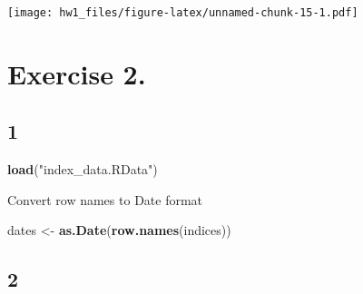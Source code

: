 \documentclass[
]{article}
\newenvironment{Shaded}{\begin{snugshade}}{\end{snugshade}}
\newcommand{\AttributeTok}[1]{\textcolor[rgb]{0.13,0.29,0.53}{#1}}
\newcommand{\CommentTok}[1]{\textcolor[rgb]{0.56,0.35,0.01}{\textit{#1}}}
\newcommand{\FunctionTok}[1]{\textcolor[rgb]{0.13,0.29,0.53}{\textbf{#1}}}
\newcommand{\NormalTok}[1]{#1}
\newcommand{\OtherTok}[1]{\textcolor[rgb]{0.56,0.35,0.01}{#1}}
\newcommand{\SpecialCharTok}[1]{\textcolor[rgb]{0.81,0.36,0.00}{\textbf{#1}}}
\newcommand{\StringTok}[1]{\textcolor[rgb]{0.31,0.60,0.02}{#1}}
\begin{document}
\texttt{[image: hw1\_files/figure-latex/unnamed-chunk-15-1.pdf]}

\section{Exercise 2.}\label{exercise-2.}

\subsection{1}\label{section}

\begin{Shaded}
\begin{Highlighting}[]
\FunctionTok{load}\NormalTok{(}\StringTok{"index\_data.RData"}\NormalTok{)}
\end{Highlighting}
\end{Shaded}

Convert row names to Date format

\begin{Shaded}
\begin{Highlighting}[]
\NormalTok{dates }\OtherTok{\textless{}{-}} \FunctionTok{as.Date}\NormalTok{(}\FunctionTok{row.names}\NormalTok{(indices))}
\end{Highlighting}
\end{Shaded}

\subsection{2}\label{section-1}

\begin{Shaded}
\end{Shaded}
\end{document}
